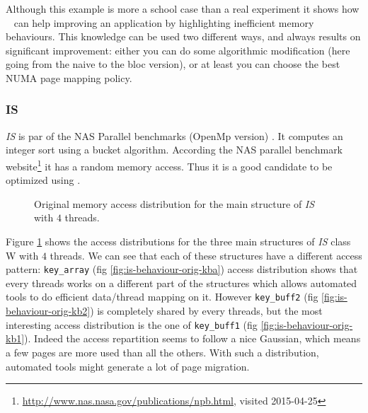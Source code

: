 Although this example is more a school case than a real experiment it shows
how \TABARNAC~ can help improving an application by highlighting inefficient
memory behaviours. This knowledge can be used two different ways, and always
results on significant improvement: either you can do some algorithmic
modification (here going from the naive to the bloc version), or at least you
can choose the best NUMA page mapping policy.

\subsubsection{IS}
\label{sec:exp-is}

\emph{IS} is par of the NAS Parallel benchmarks (OpenMp version)
\cite{Feng04Unstructured}.  It computes an integer sort using a bucket
algorithm. According the NAS parallel benchmark
website\footnote{\url{http://www.nas.nasa.gov/publications/npb.html}, visited
2015-04-25} it has a random memory access. Thus it is a good candidate to be
optimized using \TABARNAC.

\begin{figure}[htb]
    \centering

    \caption{Original memory access distribution for the main structure of
        \emph{IS} with $4$ threads.}
    \label{fig:is-behaviour-orig}
\end{figure}

Figure \ref{fig:is-behaviour-orig} shows the access distributions for the
three main structures of \emph{IS} class W with $4$ threads. We can see that
each of these structures have a different access pattern: \texttt{key\_array}
(fig \ref{fig:is-behaviour-orig-kba}) access distribution shows that every
threads works on a different part of the structures which allows automated
tools to do efficient data/thread mapping on it. However \texttt{key\_buff2}
(fig \ref{fig:is-behaviour-orig-kb2}) is completely shared by every threads,
but the most interesting access distribution is the one of \texttt{key\_buff1}
(fig \ref{fig:is-behaviour-orig-kb1}). Indeed the access repartition seems to
follow a nice Gaussian, which means a few pages are more used than all the
others. With such a distribution, automated tools might generate a lot of page
migration.

